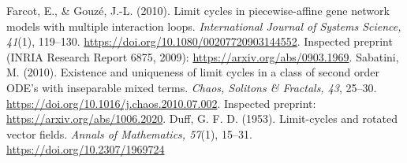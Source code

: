  Farcot, E., \& Gouz\'e, J.-L. (2010). Limit cycles in piecewise-affine gene network models with multiple interaction loops. \emph{International Journal of Systems Science, 41}(1), 119--130. \url{https://doi.org/10.1080/00207720903144552}. Inspected preprint (INRIA Research Report 6875, 2009): \url{https://arxiv.org/abs/0903.1969}.
 Sabatini, M. (2010). Existence and uniqueness of limit cycles in a class of second order ODE's with inseparable mixed terms. \emph{Chaos, Solitons \& Fractals, 43}, 25--30. \url{https://doi.org/10.1016/j.chaos.2010.07.002}. Inspected preprint: \url{https://arxiv.org/abs/1006.2020}.
 Duff, G. F. D. (1953). Limit-cycles and rotated vector fields. \emph{Annals of Mathematics, 57}(1), 15--31. \url{https://doi.org/10.2307/1969724}
